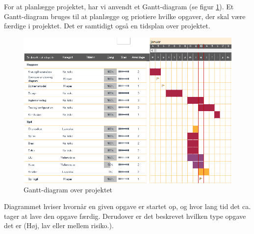 For at planlægge projektet, har vi anvendt et Gantt-diagram (se figur \ref{fig:gantt}). Et Gantt-diagram bruges til at planlægge og priotiere hvilke opgaver, der skal være færdige i projektet. Det er samtidigt også en tidsplan over projektet.

\begin{figure}[h]
    \centering
    \includegraphics[width=\textwidth]{sources/gantt.PNG}
    \caption{Gantt-diagram over projektet}
    \label{fig:gantt}
\end{figure}

Diagrammet hviser hvornår en given opgave er startet op, og hvor lang tid det ca. tager at lave den opgave færdig. Derudover er det beskrevet hvilken type opgave det er (Høj, lav eller mellem risiko.). 